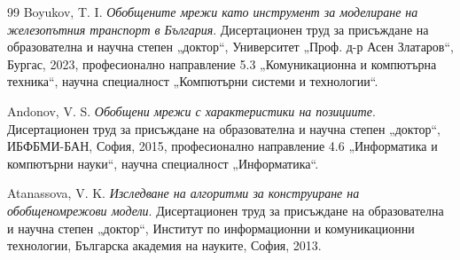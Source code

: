 \begin{thebibliography}{99}
Boyukov, T. I.
\newblock \emph{Обобщените мрежи като инструмент за моделиране на железопътния транспорт в България}.
\newblock Дисертационен труд за присъждане на образователна и научна степен „доктор“, Университет „Проф. д-р Асен Златаров“, Бургас, 2023, професионално направление 5.3 „Комуникационна и компютърна техника“, научна специалност „Компютърни системи и технологии“.

Andonov, V. S.
\newblock \emph{Обобщени мрежи с характеристики на позициите}.
\newblock Дисертационен труд за присъждане на образователна и научна степен „доктор“, ИБФБМИ-БАН, София, 2015, професионално направление 4.6 „Информатика и компютърни науки“, научна специалност „Информатика“.

Atanassova, V. K.
\newblock \emph{Изследване на алгоритми за конструиране на обобщеномрежови модели}.
\newblock Дисертационен труд за присъждане на образователна и научна степен „доктор“, Институт по информационни и комуникационни технологии, Българска академия на науките, София, 2013.

\end{thebibliography}
